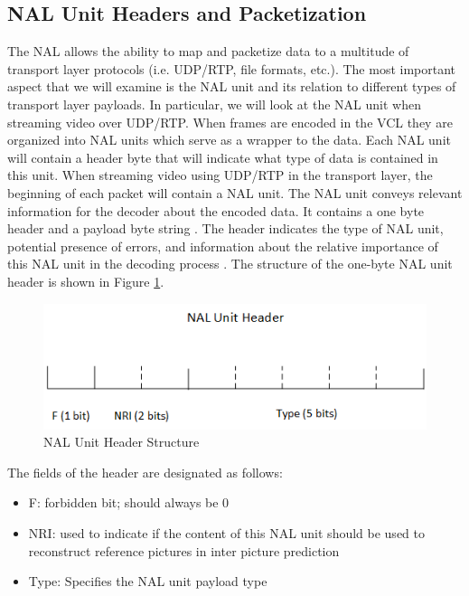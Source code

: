\documentclass[a4paper,12pt]{article}
\begin{document}
\subsection{NAL Unit Headers and Packetization}
\label{sec:NALandPacketization}

The NAL allows the ability to map and packetize data to a multitude of transport layer protocols (i.e. UDP/RTP, file formats, etc.). The most important aspect that we will examine is the NAL unit and its relation to different types of transport layer payloads. In particular, we will look at the NAL unit when streaming video over UDP/RTP. When frames are encoded in the VCL they are organized into NAL units which serve as a wrapper to the data. Each NAL unit will contain a header byte that will indicate what type of data is contained in this unit. When streaming video using UDP/RTP in the transport layer, the beginning of each packet will contain a NAL unit. The NAL unit conveys relevant information for the decoder about the encoded data. It contains a one byte header and a payload byte string \cite{RTP}. The header indicates the type of NAL unit, potential presence of errors, and information about the relative importance of this NAL unit in the decoding process \cite{RTP}. The structure of the one-byte NAL unit header is shown in Figure \ref{fig:NALHeaderStructure}.
\begin{figure}[h]
\centering
\includegraphics[width=0.7\linewidth]{NALUnitHeader.png}
\caption{NAL Unit Header Structure}
\label{fig:NALHeaderStructure}
\end{figure}
The fields of the header are designated as follows:
\begin{itemize}
\item F: forbidden bit; should always be 0
\item NRI: used to indicate if the content of this NAL unit should be used to reconstruct reference pictures in inter picture prediction
\item Type: Specifies the NAL unit payload type
\end{itemize}
\end{document}
